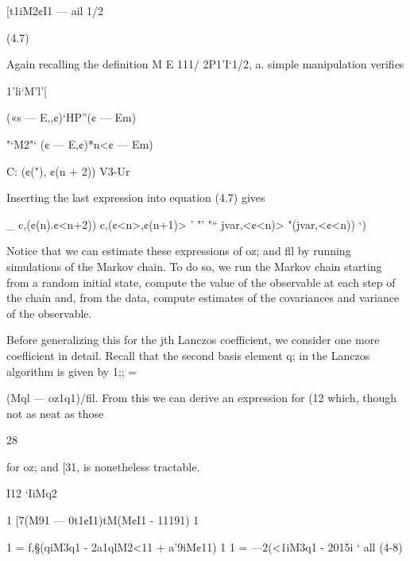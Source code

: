 [t1iM2¢I1 — ail 1/2

(4.7)

Again recalling the deﬁnition M E 111/ 2P1'I‘1/2, a. simple manipulation veriﬁes

1'li‘M’l'[%

(«s — E,,¢)‘HP”(¢ — Em)

"‘M2"‘ (¢ — E,¢)*n<¢ — Em)

C: (¢("), ¢(n + 2))
V3-Ur 

Inserting the last expression into equation (4.7) gives

_ c,(¢(n).¢<n+2)) c,(¢<n>,¢(n+1)> ’ "’
"“ jvar,<¢<n)> "(jvar,<¢<n)) ‘)

Notice that we can estimate these expressions of oz; and ﬂl by running simulations of the Markov
chain. To do so, we run the Markov chain starting from a random initial state, compute the value of
the observable at each step of the chain and, from the data, compute estimates of the covariances
and variance of the observable.

Before generalizing this for the jth Lanczos coefficient, we consider one more coeﬂicient
in detail. Recall that the second basis element q; in the Lanczos algorithm is given by 1;; =

(Mql — oz1q1)/ﬁl. From this we can derive an expression for (12 which, though not as neat as those

28

for oz; and [31, is nonetheless tractable.

I12 ‘IiMq2

1
[7(M91 — 0t1¢I1)tM(M¢I1 - 11191)
1

1
= f,§(qiM3q1 - 2a1qlM2<11 + a’9iM¢11)
1
1
= —2(<1iM3q1 - 2015i ‘ all (4-8)

